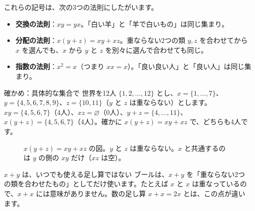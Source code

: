 \documentclass[a4paper,11pt,openany]{ltjsbook}
\begin{document}
これらの記号は、次の3つの法則にしたがいます。

\begin{itemize}[leftmargin=*]
\item \textbf{交換の法則}：$xy=yx$。「白い羊」と「羊で白いもの」は同じ集まり。
\item \textbf{分配の法則}：$x(y+z)=xy+xz$。重ならない2つの類 $y,z$ を合わせてから $x$ を選んでも、$x$ から $y$ と $z$ を別々に選んで合わせても同じ。
\item \textbf{指数の法則}：$x^2=x$（つまり $xx=x$）。「良い良い人」と「良い人」は同じ集まり。
\end{itemize}

\begin{examplebox}{確かめ：具体的な集合で}
世界を12人 $\{1,2,\ldots,12\}$ とし、$x=\{1,\ldots,7\}$、$y=\{4,5,6,7,8,9\}$、$z=\{10,11\}$（$y$ と $z$ は重ならない）とします。$xy=\{4,5,6,7\}$（4人）、$xz=\varnothing$（0人）、$y+z=\{4,\ldots,11\}$、$x(y+z)=\{4,5,6,7\}$（4人）。確かに $x(y+z)=xy+xz$ で、どちらも4人です。
\end{examplebox}

\begin{figure}[htbp]
\centering
{}
\caption{$x(y+z)=xy+xz$ の図。$y$ と $z$ は重ならない。$x$ と共通するのは $y$ の側の $xy$ だけ（$xz$ は空）。}
\end{figure}

\begin{pointbox}{$x+y$ は、いつでも使える足し算ではない}
ブールは、$x+y$ を「重ならない2つの類を合わせたもの」としてだけ使います。たとえば $x$ と $x$ は重なっているので、$x+x$ には意味がありません。数の足し算 $x+x=2x$ とは、この点が違います。
\end{pointbox}
\end{document}
